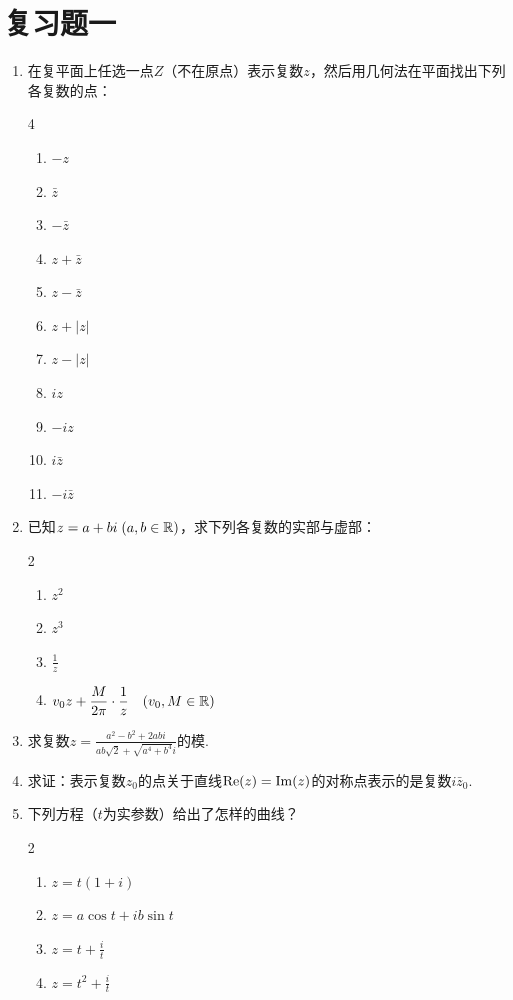 \section*{复习题一}
\begin{enumerate}
    \item 在复平面上任选一点$Z$（不在原点）表示复数$z$，然后用几何法在平面找出下列各复数的点：
\begin{multicols}{4}
\begin{enumerate}[(1)]
    \item $-z$
    \item $\bar z$
    \item $-\bar z$
    \item $z+\bar z$
    \item $z-\bar z$
    \item $z+|z|$
    \item $z-|z|$
    \item $iz$
    \item $-iz$
    \item $i\bar z$
    \item $-i\bar z$
\end{enumerate}
\end{multicols}

\item 已知$z=a+bi\; (a,b\in\mathbb{R})$，求下列各复数的实部与虚部：
\begin{multicols}{2}
\begin{enumerate}[(1)]
    \item $z^2$
    \item $z^3$
    \item $\frac{1}{z}$
    \item $v_0 z+\dfrac{M}{2\pi}\cdot \dfrac{1}{z}\quad (v_0,M\in\mathbb{R})$
\end{enumerate}
\end{multicols}

\item 求复数$z=\frac{a^2-b^2+2abi}{ab\sqrt{2}+\sqrt{a^4+b^4}i}$的模.

\item 求证：表示复数$z_0$的点关于直线${\rm Re}(z)={\rm Im}(z)$的对称点表示的是复数$i\bar z_0$.

\item 下列方程（$t$为实参数）给出了怎样的曲线？
\begin{multicols}{2}
\begin{enumerate}[(1)]
    \item $z=t(1+i)$
    \item $z=a\cos t+ib\sin t$
    \item $z=t+\frac{i}{t}$
    \item $z=t^2+\frac{i}{t}$
\end{enumerate}
\end{multicols}


\end{enumerate}
